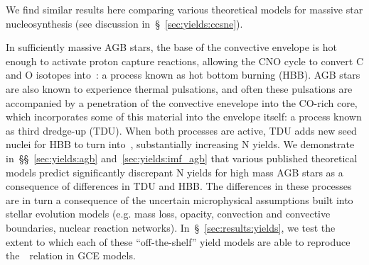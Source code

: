 \documentclass[ms.tex]{subfiles}
\begin{document}
We find similar results here comparing various theoretical models for massive
star nucleosynthesis (see discussion in~\S~\ref{sec:yields:ccsne}).
\par
In sufficiently massive AGB stars, the base of the convective envelope is hot
enough to activate proton capture reactions, allowing the CNO cycle to convert
C and O isotopes into~\Nfourteen: a process known as hot bottom burning (HBB).
AGB stars are also known to experience thermal pulsations, and often these
pulsations are accompanied by a penetration of the convective enevelope into the
CO-rich core, which incorporates some of this material into the envelope
itself: a process known as third dredge-up (TDU).
When both processes are active, TDU adds new seed nuclei for HBB to turn
into~\Nfourteen, substantially increasing N yields.
We demonstrate in~\S\S~\ref{sec:yields:agb} and~\ref{sec:yields:imf_agb} that
various published theoretical models predict significantly discrepant N yields
for high mass AGB stars as a consequence of differences in TDU and
HBB.
The differences in these processes are in turn a consequence of the uncertain
microphysical assumptions built into stellar evolution models (e.g. mass
loss, opacity, convection and convective boundaries, nuclear reaction
networks).
In~\S~\ref{sec:results:yields}, we test the extent to which each of these
``off-the-shelf'' yield models are able to reproduce the~\ohno~relation in
GCE models.
\par
\end{document}
